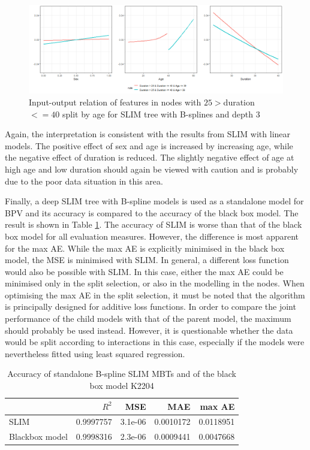 \begin{figure}[!htb]
    \centering    
    \includegraphics[width = 16cm]{Figures/insurance_use_case/k2204_BPV/effects_age_medium_duration.png}
    \caption{Input-output relation of features in nodes with $25 > $duration $<= 40$ split by age for SLIM tree with B-splines and depth 3}
    \label{fig:ins_k2204_effects_age_medium_duration}
\end{figure}

Again, the interpretation is consistent with the results from SLIM with linear models. The positive effect of sex and age is increased by increasing age, while the negative effect of duration is reduced. The slightly negative effect of age at high age and low duration should again be viewed with caution and is probably due to the poor data situation in this area.


Finally, a deep SLIM tree with B-spline models is used as a standalone model for BPV and its accuracy is compared to the accuracy of the black box model. The result is shown in Table \ref{tab:ins_k2204_standalone_slim}.
The accuracy of SLIM is worse than that of the black box model for all evaluation measures. However, the difference is most apparent for the max AE. While the max AE is explicitly minimised in the black box model, the MSE is minimised with SLIM. In general, a different loss function would also be possible with SLIM. In this case, either the max AE could be minimised only in the split selection, or also in the modelling in the nodes. When optimising the max AE in the split selection, it must be noted that the algorithm is principally designed for additive loss functions. In order to compare the joint performance of the child models with that of the parent model, the maximum should probably be used instead. 
However, it is questionable whether the data would be split according to interactions in this case, especially if the models were nevertheless fitted using least squared regression.

\begin{table}[!htb]

\caption{Accuracy of standalone B-spline SLIM MBTs and of the black box model K2204}
\centering \scriptsize
\begin{tabular}[t]{l|r|r|r|r}
\hline
  & $R^2$ & MSE & MAE & max AE \\
\hline
SLIM & 0.9997757 & 3.1e-06 & 0.0010172 & 0.0118951\\
Blackbox model & 0.9998316 & 2.3e-06 & 0.0009441 & 0.0047668\\
\hline
\end{tabular}
\label{tab:ins_k2204_standalone_slim}
\end{table}








